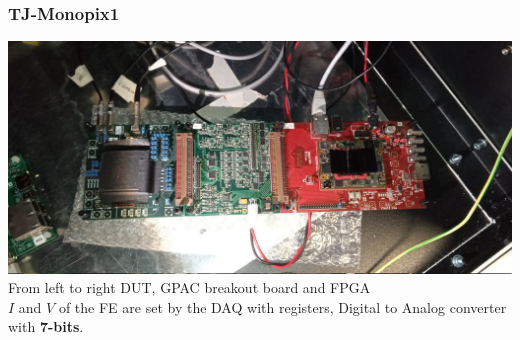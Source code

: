     \begin{frame}
        \frametitle{TJ-Monopix1}
            \centering
            \includegraphics[width=.8\linewidth]{figures/Monopix1/monopix1_front.jpeg}\\
            From left to right DUT, GPAC breakout board and FPGA\\
            $I$ and $V$ of the FE are set by the DAQ with registers, Digital to Analog converter with \textbf{7-bits}.\\
    \end{frame} 
 







